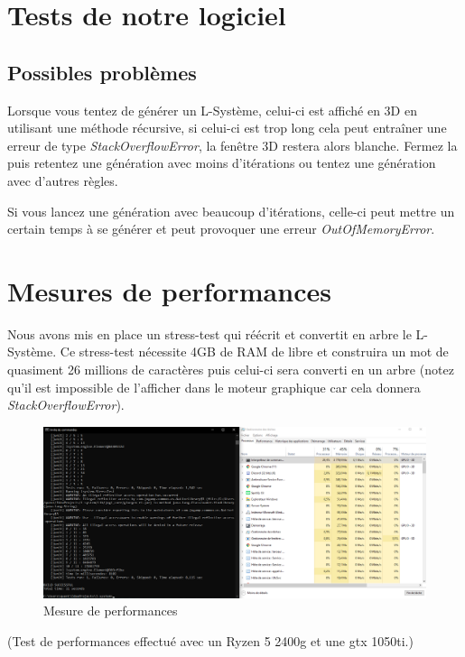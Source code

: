 \section{Tests de notre logiciel}

\subsection{Possibles problèmes}

Lorsque vous tentez de générer un L-Système, celui-ci est affiché en 3D en utilisant une méthode récursive, si celui-ci est trop long cela peut entraîner une erreur de type \textit{StackOverflowError}, la fenêtre 3D restera alors blanche. Fermez la puis retentez une génération avec moins d'itérations ou tentez une génération avec d'autres règles.

Si vous lancez une génération avec beaucoup d'itérations, celle-ci peut mettre un certain temps à se générer et peut provoquer une erreur \textit{OutOfMemoryError}.

\section{Mesures de performances}

Nous avons mis en place un stress-test qui réécrit et convertit en arbre le L-Système.
Ce stress-test nécessite 4GB de RAM de libre et construira un mot de quasiment 26 millions de caractères puis celui-ci sera converti en un arbre (notez qu'il est impossible de l'afficher dans le moteur graphique car cela donnera \textit{StackOverflowError}).

\begin{figure}[h!]
    \centering
    \includegraphics[scale=0.3]{pics/stresstest.png}
    \caption{Mesure de performances}
    \label{Perf}
\end{figure}

(Test de performances effectué avec un Ryzen 5 2400g et une gtx 1050ti.)

